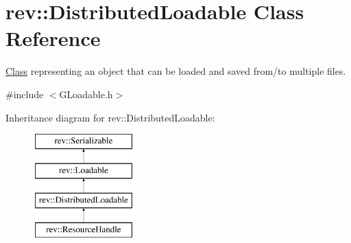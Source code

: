 \hypertarget{classrev_1_1_distributed_loadable}{}\section{rev\+::Distributed\+Loadable Class Reference}
\label{classrev_1_1_distributed_loadable}


\mbox{\hyperlink{struct_class}{Class}} representing an object that can be loaded and saved from/to multiple files.  




{\ttfamily \#include $<$G\+Loadable.\+h$>$}

Inheritance diagram for rev\+::Distributed\+Loadable\+:\begin{figure}[H]
\begin{center}
\leavevmode
\includegraphics[height=4.000000cm]{classrev_1_1_distributed_loadable}
\end{center}
\end{figure}
